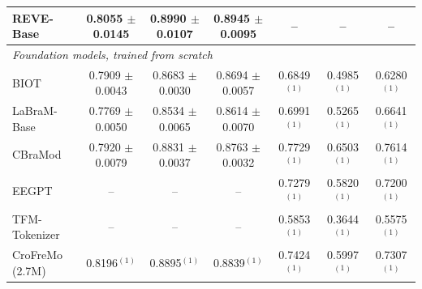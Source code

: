 \begin{table}[t]
{\begin{tabular}{lcccccc}
REVE-Base & 0.8055 $\pm$ 0.0145 & 0.8990 $\pm$ 0.0107 & 0.8945 $\pm$ 0.0095 & -- & -- & -- \\
\midrule
\multicolumn{7}{l}{\textit{Foundation models, trained from scratch}} \\
BIOT & 0.7909 $\pm$ 0.0043 & 0.8683 $\pm$ 0.0030 & 0.8694 $\pm$ 0.0057 & 0.6849$^{(1)}$ & 0.4985$^{(1)}$ & 0.6280$^{(1)}$ \\
LaBraM-Base & 0.7769 $\pm$ 0.0050 & 0.8534 $\pm$ 0.0065 & 0.8614 $\pm$ 0.0070 & 0.6991$^{(1)}$ & 0.5265$^{(1)}$ & 0.6641$^{(1)}$ \\
CBraMod & 0.7920 $\pm$ 0.0079 & 0.8831 $\pm$ 0.0037 & 0.8763 $\pm$ 0.0032 & 0.7729$^{(1)}$ & 0.6503$^{(1)}$ & 0.7614$^{(1)}$ \\
EEGPT & -- & -- & -- & 0.7279$^{(1)}$ & 0.5820$^{(1)}$ & 0.7200$^{(1)}$ \\
TFM-Tokenizer & -- & -- & -- & 0.5853$^{(1)}$ & 0.3644$^{(1)}$ & 0.5575$^{(1)}$ \\
\midrule
CroFreMo (2.7M) & 0.8196$^{(1)}$ & 0.8895$^{(1)}$ & 0.8839$^{(1)}$ & 0.7424$^{(1)}$ & 0.5997$^{(1)}$ & 0.7307$^{(1)}$ \\
\bottomrule
\end{tabular}}
\end{table}

